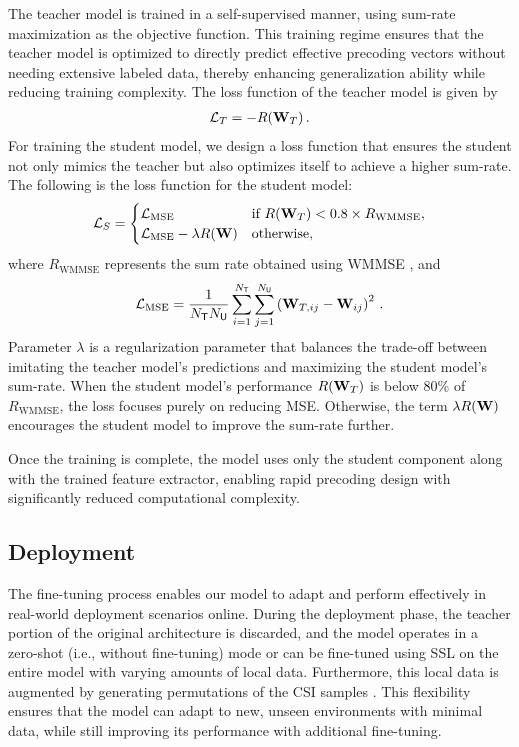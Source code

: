 The teacher model is trained in a self-supervised manner, using sum-rate maximization as the objective function. This training regime ensures that the teacher model is optimized to directly predict effective precoding vectors without needing extensive labeled data, thereby enhancing generalization ability while reducing training complexity. The loss function of the teacher model is given by
\begin{align}
    \mathcal{L}_{T} = - R(\mathbf{W}_{T}) \,.
\end{align}
For training the student model, we design a loss function that ensures the student not only mimics the teacher but also optimizes itself to achieve a higher sum-rate. The following is the loss function for the student model: 
\begin{align}
    \mathcal{L}_{S} = 
\begin{cases}
    \mathcal{L}_{\text{MSE}}                             &  \text{if $R(\mathbf{W}_{T}) < 0.8\times R_{\text{WMMSE}}$}, \\
    \mathcal{L}_{\text{MSE}} - \lambda  R(\mathbf{W}) &  \text{otherwise},
\end{cases}
\end{align}
where $R_{\text{WMMSE}}$ represents the sum rate obtained using \gls{WMMSE} \cite{shi2011iteratively}, and
\begin{align}
    \mathcal{L}_{\text{MSE}} = \frac{1}{N_{\sf{T}} N_{\sf{U}}} \sum_{i=1}^{N_{\sf{T}}} \sum_{j=1}^{N_{\sf{U}}} \left ( \mathbf{W}_{T,ij} - \mathbf{W}_{ij} \right)^2 \,.
\end{align}
% 
Parameter $\lambda$ is a regularization parameter that balances the trade-off between imitating the teacher model’s predictions and maximizing the student model's sum-rate. When the student model’s performance $R(\mathbf{W}_{T})$ is below 80\% of $R_{\text{WMMSE}}$, the loss focuses purely on reducing MSE. Otherwise, the term $\lambda R(\mathbf{W})$ encourages the student model to improve the sum-rate further. 

Once the training is complete, the model uses only the student component along with the trained feature extractor, enabling rapid precoding design with significantly reduced computational complexity.

\subsection{Deployment}
The fine-tuning process enables our model to adapt and perform effectively in real-world deployment scenarios online. During the deployment phase, the teacher portion of the original architecture is discarded, and the model operates in a zero-shot (i.e., without fine-tuning) mode or can be fine-tuned using \gls{SSL} on the entire model with varying amounts of local data. Furthermore, this local data is augmented by generating permutations of the CSI samples \cite{10624768}. This flexibility ensures that the model can adapt to new, unseen environments with minimal data, while still improving its performance with additional fine-tuning.

